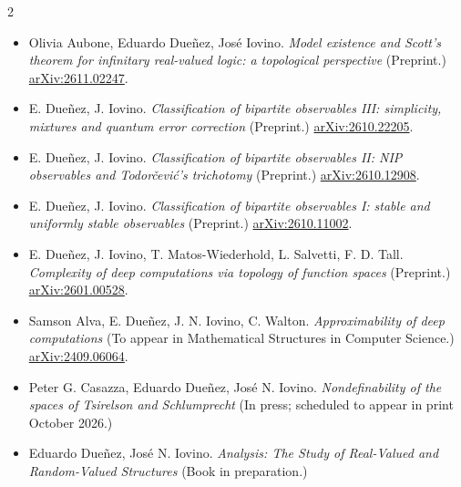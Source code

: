 \documentclass[10pt,a4paper,withhyper]{altacv}
\begin{document}
\begin{paracol}{2}
\switchcolumn


\begin{itemize}
\item Olivia Aubone, Eduardo Due{\~n}ez, Jos{\'e} Iovino. \emph{Model existence and {S}cott's theorem for infinitary real-valued logic: a topological perspective} (Preprint.) \href{https://arxiv.org/abs/2611.02247}{arXiv:2611.02247}.
\item E. Due{\~n}ez, J. Iovino. \emph{Classification of bipartite observables {III}: simplicity, mixtures and quantum error correction} (Preprint.) \href{https://arxiv.org/abs/2610.22205}{arXiv:2610.22205}.
\item E. Due{\~n}ez, J. Iovino. \emph{Classification of bipartite observables {II}: {NIP} observables and {Todor\v{c}evi\'c}'s trichotomy} (Preprint.) \href{https://arxiv.org/abs/2610.12908}{arXiv:2610.12908}.
\item E. Due{\~n}ez, J. Iovino. \emph{Classification of bipartite observables {I}: stable and uniformly stable observables} (Preprint.) \href{https://arxiv.org/abs/2610.11002}{arXiv:2610.11002}.
\item E. Due{\~n}ez, J. Iovino, T. Matos-Wiederhold, L. Salvetti, F. D. Tall. \emph{Complexity of deep computations via topology of function spaces} (Preprint.) \href{https://doi.org/10.48550/arXiv.2601.00528}{arXiv:2601.00528}.
\item Samson Alva, E. Dueñez, J. N. Iovino, C. Walton. \emph{Approximability of deep computations} (To appear in Mathematical Structures in Computer Science.) \href{https://doi.org/10.48550/arXiv.2409.06064}{arXiv:2409.06064}.
\item Peter G. Casazza, Eduardo Due\~{n}ez, Jos{\'e} N. Iovino. \emph{Nondefinability of the spaces of Tsirelson and Schlumprecht} (In press; scheduled to appear in print October 2026.)
\item Eduardo Due\~{n}ez, Jos\'{e} N. Iovino. \emph{Analysis: The Study of Real-Valued and Random-Valued Structures} (Book in preparation.)
\end{itemize}


\end{paracol}
\end{document}
